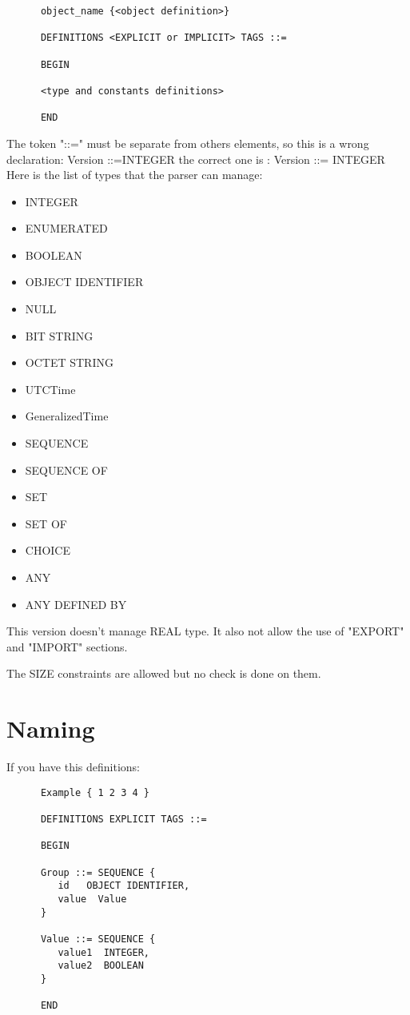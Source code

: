 \documentclass{book}
\begin{document}
\begin{verbatim}
      object_name {<object definition>}

      DEFINITIONS <EXPLICIT or IMPLICIT> TAGS ::=

      BEGIN 

      <type and constants definitions>

      END
\end{verbatim}

\par
The token "::=" must be separate from others elements, so this is a wrong declaration:
      Version ::=INTEGER 
the correct one is :   Version ::= INTEGER
Here is the list of types that the parser can manage:
\begin{itemize}

\item      INTEGER
\item      ENUMERATED
\item      BOOLEAN
\item      OBJECT IDENTIFIER
\item      NULL
\item      BIT STRING
\item      OCTET STRING
\item      UTCTime
\item      GeneralizedTime
\item      SEQUENCE
\item      SEQUENCE OF
\item      SET 
\item      SET OF
\item      CHOICE
\item      ANY
\item      ANY DEFINED BY
\end{itemize}

This version doesn't manage REAL type. It also not allow the use of 
"EXPORT" and "IMPORT" sections.

The SIZE constraints are allowed but no check is done on them.



\section{Naming}
If you have this definitions:

\begin{verbatim}
      Example { 1 2 3 4 }

      DEFINITIONS EXPLICIT TAGS ::=

      BEGIN 

      Group ::= SEQUENCE {
         id   OBJECT IDENTIFIER,
         value  Value
      }

      Value ::= SEQUENCE {
         value1  INTEGER,
         value2  BOOLEAN 
      }

      END
\end{verbatim}
\end{document}
